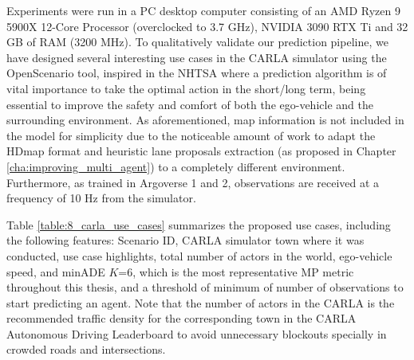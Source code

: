 Experiments were run in a PC desktop computer consisting of an AMD Ryzen 9 5900X 12-Core Processor (overclocked to 3.7 GHz), NVIDIA 3090 RTX Ti and 32 GB of RAM (3200 MHz). To qualitatively validate our prediction pipeline, we have designed several interesting use cases in the \ac{CARLA} simulator using the OpenScenario tool, inspired in the \ac{NHTSA} where a prediction algorithm is of vital importance to take the optimal action in the short/long term, being essential to improve the safety and comfort of both the ego-vehicle and the surrounding environment. As aforementioned, map information is not included in the model for simplicity due to the noticeable amount of work to adapt the \ac{HDmap} format and heuristic lane proposals extraction (as proposed in Chapter \ref{cha:improving_multi_agent}) to a completely different environment. Furthermore, as trained in Argoverse 1 and 2, observations are received at a frequency of 10 Hz from the simulator.

Table \ref{table:8_carla_use_cases} summarizes the proposed use cases, including the following features: Scenario ID, \ac{CARLA} simulator town where it was conducted, use case highlights, total number of actors in the world, ego-vehicle speed, and \ac{minADE} $K$=6, which is the most representative \ac{MP} metric throughout this thesis, and a threshold of minimum of number of observations to start predicting an agent. Note that the number of actors in the \ac{CARLA} is the recommended traffic density for the corresponding town in the \ac{CARLA} Autonomous Driving Leaderboard to avoid unnecessary blockouts specially in crowded roads and intersections.

